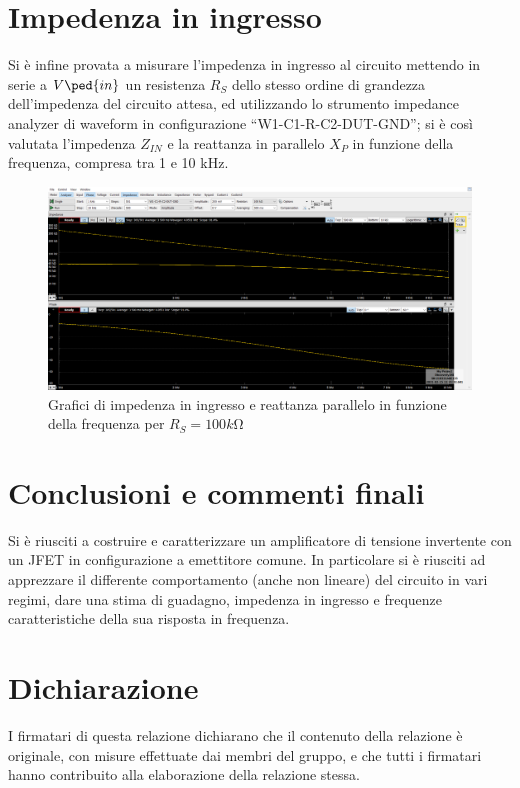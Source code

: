 \documentclass[10pt, a4paper, italian]{article}
\begin{document}
\section{Impedenza in ingresso}
Si è infine provata a misurare l'impedenza in ingresso al circuito mettendo in serie a $V\ped{in}$ un resistenza $R_S$ dello stesso ordine di grandezza dell'impedenza del circuito attesa, ed utilizzando lo strumento impedance analyzer di waveform in configurazione “W1-C1-R-C2-DUT-GND”; si è così valutata l'impedenza $Z_{IN}$ e la reattanza in parallelo $X_P$ in funzione della frequenza, compresa tra 1 e 10 kHz.
\begin{figure}[htbp]
    \centering
	\includegraphics[scale=0.4]{impedance}
    \caption{Grafici di impedenza in ingresso e reattanza parallelo in funzione della frequenza per $R_S=100 \si{k\ohm}$}
\end{figure}

\section*{Conclusioni e commenti finali}
Si è riusciti a costruire e caratterizzare un amplificatore di tensione
invertente con un JFET in configurazione a emettitore comune. In particolare
si è riusciti ad apprezzare il differente comportamento (anche non lineare)
del circuito in vari regimi, dare una stima di guadagno, impedenza in
ingresso e frequenze caratteristiche della sua risposta in frequenza.

\section*{Dichiarazione}
I firmatari di questa relazione dichiarano che il contenuto della relazione \`e
originale, con misure effettuate dai membri del gruppo, e che tutti i firmatari
hanno contribuito alla elaborazione della relazione stessa.
\end{document}

